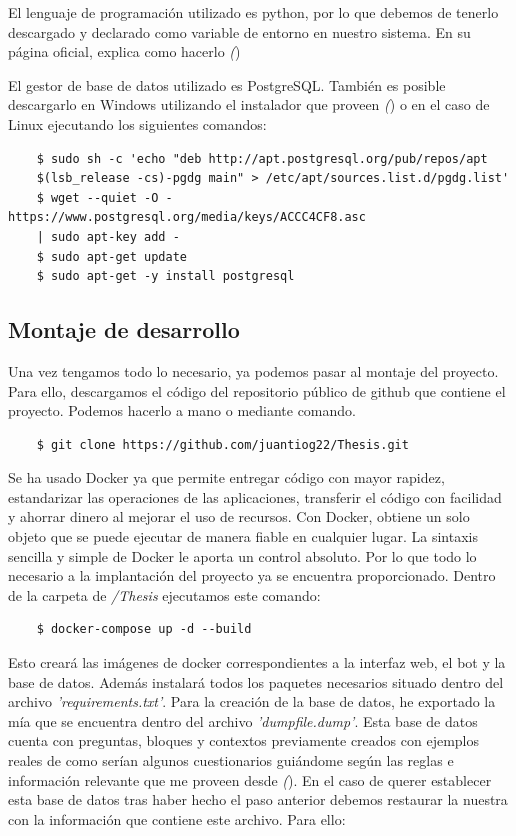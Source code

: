 El lenguaje de programación utilizado es python, por lo que debemos de tenerlo descargado y declarado como variable de entorno en nuestro sistema. En su página oficial, explica como hacerlo \textit({\cite{python})}

El gestor de base de datos utilizado es PostgreSQL. También es posible descargarlo en Windows utilizando el instalador que proveen \textit({\cite{postgres})} o en el caso de Linux ejecutando los siguientes comandos:

\begin{verbatim}
    $ sudo sh -c 'echo "deb http://apt.postgresql.org/pub/repos/apt
    $(lsb_release -cs)-pgdg main" > /etc/apt/sources.list.d/pgdg.list'
    $ wget --quiet -O - https://www.postgresql.org/media/keys/ACCC4CF8.asc 
    | sudo apt-key add -
    $ sudo apt-get update
    $ sudo apt-get -y install postgresql
\end{verbatim}


\subsection{Montaje de desarrollo}

Una vez tengamos todo lo necesario, ya podemos pasar al montaje del proyecto. Para ello, descargamos el código del repositorio público de github que contiene el proyecto. Podemos hacerlo a mano o mediante comando.

\begin{verbatim}
    $ git clone https://github.com/juantiog22/Thesis.git
\end{verbatim}

Se ha usado Docker ya que permite entregar código con mayor rapidez, estandarizar las operaciones de las aplicaciones, transferir el código con facilidad y ahorrar dinero al mejorar el uso de recursos. Con Docker, obtiene un solo objeto que se puede ejecutar de manera fiable en cualquier lugar. La sintaxis sencilla y simple de Docker le aporta un control absoluto. Por lo que todo lo necesario a la implantación del proyecto ya se encuentra proporcionado. Dentro de la carpeta de \textit{/Thesis} ejecutamos este comando:

\begin{verbatim}
    $ docker-compose up -d --build  
\end{verbatim}

Esto creará las imágenes de docker correspondientes a la interfaz web, el bot y la base de datos. Además instalará todos los paquetes necesarios situado dentro del archivo \textit{'requirements.txt'}. 
Para la creación de la base de datos, he exportado la mía que se encuentra dentro del archivo \textit{'dumpfile.dump'}. Esta base de datos cuenta con preguntas, bloques y contextos previamente creados con ejemplos reales de como serían algunos cuestionarios guiándome según las reglas e información relevante que me proveen desde \textit({\cite{postcovid})}. En el caso de querer establecer esta base de datos tras haber hecho el paso anterior debemos restaurar la nuestra con la información que contiene este archivo. Para ello:

